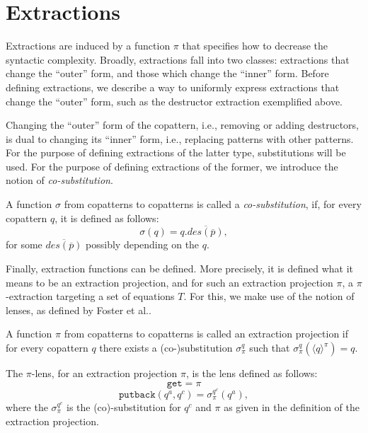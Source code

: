\section{Extractions}
\label{sec:extrdef}

Extractions are induced by a function $\pi$ that specifies how to decrease the syntactic complexity. Broadly, extractions fall into two classes: extractions that change the ``outer'' form, and those which change the ``inner'' form. Before defining extractions, we describe a way to uniformly express extractions that change the ``outer'' form, such as the destructor extraction exemplified above.

Changing the ``outer'' form of the copattern, i.e., removing or adding destructors, is dual to changing its ``inner'' form, i.e., replacing patterns with other patterns. For the purpose of defining extractions of the latter type, substitutions will be used. For the purpose of defining extractions of the former, we introduce the notion of \textit{co-substitution}.

\begin{definition}[Co-substitution]
A function $\sigma$ from copatterns to copatterns is called a \textit{co-substitution}, if, for every copattern $q$, it is defined as follows:
\[
\sigma(q) = q.\overline{des(\overline{p})},
\]
for some $\overline{des(\overline{p})}$ possibly depending on the $q$.
\end{definition}

Finally, extraction functions can be defined. More precisely, it is defined what it means to be an extraction projection, and for such an extraction projection $\pi$, a $\pi$-extraction targeting a set of equations $T$. For this, we make use of the notion of lenses, as defined by Foster et al.\cite{foster05combinators}.

\begin{definition}
\label{def:extrproj}
A function $\pi$ from copatterns to copatterns is called an extraction projection if for every copattern $q$ there exists a (co-)substitution $\sigma^q_\pi$ such that $\sigma^q_\pi(\langle q \rangle^\pi) = q$.
\end{definition}

\begin{definition}[$\pi$-lens]
The $\pi$-lens, for an extraction projection $\pi$, is the lens defined as follows:
\[
\mathtt{get} = \pi
\]
\[
\mathtt{putback}(q^a, q^c) = \sigma^{q^c}_\pi(q^a),
\]
where the $\sigma^{q^c}_\pi$ is the (co)-substitution for $q^c$ and $\pi$ as given in the definition of the extraction projection.
\end{definition}

